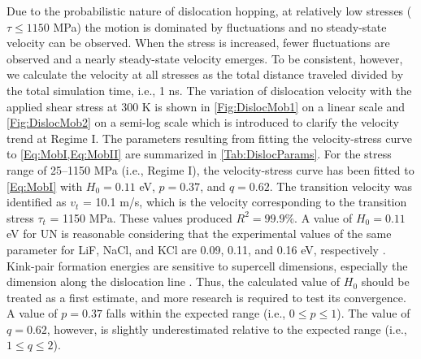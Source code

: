 \documentclass[applsci,article,submit,pdftex,moreauthors]{Definitions/mdpi}
\newcommand{\?}{\stackrel{?}{=}}
\begin{document}
Due to the probabilistic nature of dislocation hopping, at relatively low stresses ($\tau \leq 1150$ MPa) the motion is dominated by fluctuations and no steady-state velocity can be observed. When the stress is increased, fewer fluctuations are observed and a nearly steady-state velocity emerges. To be consistent, however, we calculate the velocity at all stresses as the total distance traveled divided by the total simulation time, i.e., 1 ns. The variation of dislocation velocity with the applied shear stress at 300 K is shown in \cref{Fig:DislocMob1} on a linear scale and \cref{Fig:DislocMob2} on a semi-log scale which is introduced to clarify the velocity trend at Regime I. The parameters resulting from fitting the velocity-stress curve to \cref{Eq:MobI,Eq:MobII} are summarized in \cref{Tab:DislocParams}. For the stress range of 25--1150 MPa (i.e., Regime I), the velocity-stress curve has been fitted to \cref{Eq:MobI} with $H_0 = 0.11$ eV, $p=0.37$, and $q=0.62$. The transition velocity was identified as $v_t$ = 10.1 m/s, which is the velocity corresponding to the transition stress $\tau_t$ = 1150 MPa. These values produced $R^2 = 99.9\%$. A value of $H_0 = 0.11$ eV for UN is reasonable considering that the experimental values of the same parameter for LiF, NaCl, and KCl are 0.09, 0.11, and 0.16 eV, respectively \cite{Haasen1985}. Kink-pair formation energies are sensitive to supercell dimensions, especially the dimension along the dislocation line \cite{Ventelon2009}. Thus, the calculated value of $H_0$ should be treated as a first estimate, and more research is required to test its convergence. A value of $p = 0.37$ falls within the expected range (i.e., $0 \leq p \leq 1$). The value of $q = 0.62$, however, is slightly underestimated relative to the expected range (i.e., $1 \leq q \leq 2$).
\end{document}
